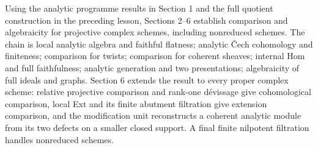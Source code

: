 \documentclass[11pt]{article}
\begin{document}
Using the analytic programme results in Section 1 and the full quotient
construction in the preceding lesson, Sections 2--6 establish comparison
and algebraicity for projective complex schemes, including nonreduced
schemes. The chain is local analytic algebra and faithful flatness;
analytic Čech cohomology and finiteness; comparison for twists;
comparison for coherent sheaves; internal Hom and full faithfulness;
analytic generation and two presentations; algebraicity of full ideals
and graphs. Section 6 extends the result to every proper complex scheme:
relative projective comparison and rank-one dévissage give cohomological
comparison, local Ext and its finite abutment filtration give extension
comparison, and the modification unit reconstructs a coherent analytic
module from its two defects on a smaller closed support. A final finite
nilpotent filtration handles nonreduced schemes.
\end{document}
